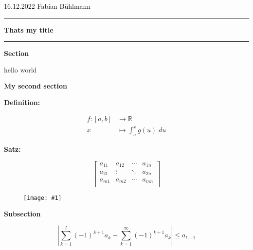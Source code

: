 \documentclass[12pt, a4paper]{article}
\newcommand{\image}[2]{
	\begin{figure}[h]
	\texttt{[image: \#1]}
	\centering
	\end{figure}}
\newcommand{\bbmatrix}[1]{\[ \begin{bmatrix} #1 \end{bmatrix}\]}
\renewcommand{\section}[1]{\vspace{0.2cm}
	\textbf{\Large\color{myblue} #1}\vspace{0.2cm}\par}
\renewcommand{\subsection}[1]{\vspace{0.2cm}\textbf{\large\color{myblue} #1}\vspace{0.2cm}\par}
\renewcommand{\maketitle}[3]{
	{#1 \hfill #2
	\vspace{0.3cm} 
	{\color{myblue}\hrule height 2pt}
	\begin{center}
	\vspace{0.2cm}
	\textbf{\color{myblue}\LARGE #3}
	\vspace{0.1cm}
	\end{center} 
	{\color{myblue}\hrule height 2pt}
	\vspace{0.3cm}}}
\newcommand{\setformat}{
	\setlength{\abovedisplayskip}{0pt}
	\setlength{\belowdisplayskip}{0pt}
	\setlength{\abovedisplayshortskip}{0pt}
	\setlength{\belowdisplayshortskip}{0pt}}
\begin{document}
	

	\setformat
	\maketitle{16.12.2022}{Fabian Bühlmann}{Thats my title}
	
	\section{Section}
	\begin{fullbox}
		hello world
	\end{fullbox}
	\section{My second section}
	\textbf{Definition:} \lipsum[13]
	
	\begin{fullbox}
	 	\begin{align*}
	 		f:[a,b] &\rightarrow \mathbb{R}\\
	 		x &\mapsto \int_a^x g(u)\; du
	 	\end{align*}
	\end{fullbox}
	
	\begin{outline}
		\textbf{Satz:} \lipsum[28]
	 
	 	\bbmatrix{
			a_{11} & a_{12} & \dotsi & a_{1n}\\
			a_{21} & \vdots & \ddots & a_{2n}\\
			a_{m1} & a_{m2} & \dotsi & a_{mn}\\}	
	\end{outline}
	 
	\image{KomplexeZahlen}{5cm}
	
	\subsection{Subsection}
	
	\[\left| \sum_{k=1}^l (-1)^{k+1} a_k -\sum_{k=1}^\infty (-1)^{k+1} a_k\right| \leq a_{l+1}\]\
	
\end{document}
